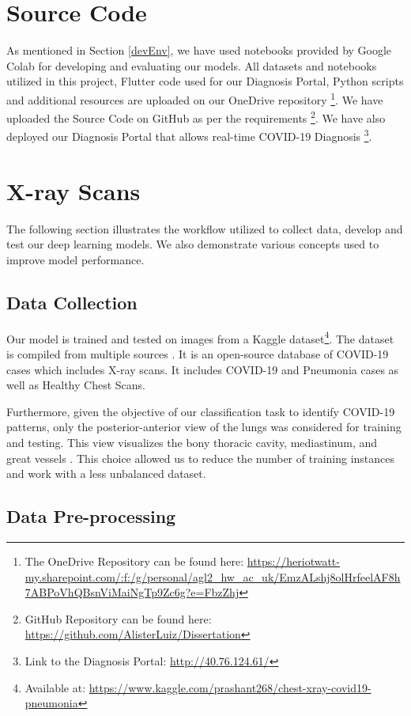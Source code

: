 \section{Source Code}

As mentioned in Section \ref{devEnv}, we have used notebooks provided by Google Colab for developing and evaluating our models. All datasets and notebooks utilized in this project, Flutter code used for our Diagnosis Portal, Python scripts and additional resources are uploaded on our OneDrive repository \footnote{The OneDrive Repository can be found here: \url{https://heriotwatt-my.sharepoint.com/:f:/g/personal/agl2_hw_ac_uk/EmzALshj8olHrfeelAF8h7ABPoVhQBsnViMaiNgTp9Zc6g?e=FbzZhj}}. We have uploaded the Source Code on GitHub as per the requirements \footnote{GitHub Repository can be found here: \url{https://github.com/AlisterLuiz/Dissertation}}. We have also deployed our Diagnosis Portal that allows real-time COVID-19 Diagnosis \footnote{Link to the Diagnosis Portal: \url{http://40.76.124.61/}}.


\section{X-ray Scans}
The following section illustrates the workflow utilized to collect data, develop and test our deep learning models. We also demonstrate various concepts used to improve model performance.

\subsection{Data Collection}

Our model is trained and tested on images from a Kaggle dataset\footnote{Available at: \url{https://www.kaggle.com/prashant268/chest-xray-covid19-pneumonia}}. The dataset is compiled from multiple  sources \cite{GAN2020, MOO2018, AGC2020}. It is an open-source database of COVID-19 cases which includes X-ray scans. It includes COVID-19 and Pneumonia cases as well as Healthy Chest Scans.


Furthermore, given the objective of our classification task to identify COVID-19 patterns, only the posterior-anterior view of the lungs was considered for training and testing. This view visualizes the bony thoracic cavity, mediastinum, and great vessels \cite{MUR2020}. This choice allowed us to reduce the number of training instances and work with a less unbalanced dataset. 

\subsection{Data Pre-processing}

